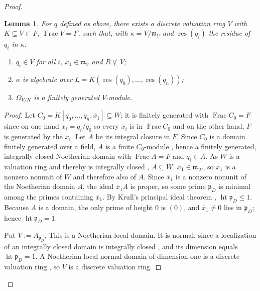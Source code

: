 \documentclass[pdflatex,sn-mathphys-num]{sn-jnl}
\numberwithin{equation}{section}
\theoremstyle{thmstyleone}
\newtheorem{lemma}[theorem]{Lemma}
\theoremstyle{thmstyletwo}
\begin{document}
\begin{proof}
\begin{lemma}\label{lem:place}
For $q$ defined as above, there exists a discrete valuation ring $V$ with $K\subseteq V\subset F$,
$\operatorname{Frac}V=F$, such that, with $\kappa=V/\mathfrak m_V$ and $\operatorname{res}(q_i)$ the
residue of $q_i$ in $\kappa$:
\begin{enumerate}[label=(\alph*)]
\item $q_i\in V$ for all $i$, $\bar x_1\in\mathfrak m_V$ and $R\not\subseteq V$;
\item $\kappa$ is algebraic over $L=K(\operatorname{res}(q_0),\dots, \operatorname{res}(q_n))$;
\item $\Omega_{V/K}$ is a finitely generated $V$-module.
\end{enumerate}
\end{lemma}
\begin{proof}
Let $C_0=K[q_0,\dots,q_n,\bar x_1]\subseteq W$; it is finitely generated with
$\operatorname{Frac}C_0=F$ since on one hand $\bar x_i = q_i/q_0$ so every $\bar x_i$ is in $\operatorname{Frac}C_0$ and on the other hand, $F$ is generated by the $\bar x_i$. Let $A$ be its integral closure in $F$. Since $C_0$ is a domain finitely generated over a field, $A$ is a finite $C_0$-module \cite[Thm. I.3.9A]{hartshorne}, hence a finitely generated, integrally
closed Noetherian domain with $\operatorname{Frac}A=F$ and $q_i\in A$. As $W$ is a valuation ring and thereby is
integrally closed \cite[Prop 5.18]{atiyah}, $A\subseteq W$. $\bar x_1 \in \mathfrak m_W$, so $x_1$ is a nonzero nonunit of $W$ and therefore also of $A$. Since $\bar x_1$ is a nonzero nonunit of the Noetherian domain $A$, the ideal
$\bar x_1A$ is proper, so some prime $\mathfrak p_D$ is minimal among the primes
containing $\bar x_1$. By Krull's principal ideal theorem
\cite[Corr. 11.17]{atiyah}, $\operatorname{ht}\mathfrak p_D\le1$. Because $A$
is a domain, the only prime of height $0$ is $(0)$, and $\bar x_1\neq0$ lies in
$\mathfrak p_D$; hence $\operatorname{ht}\mathfrak p_D=1$.

Put $V:=A_{\mathfrak p_D}$. This is a Noetherian local domain. It is normal,
since a localization of an integrally closed domain is integrally closed \cite[Prop 5.12]{atiyah}, and
its dimension equals $\operatorname{ht}\mathfrak p_D=1$. A Noetherian local
normal domain of dimension one is a discrete valuation ring
\cite[Thm. 11.2]{matsumura}, so $V$ is a discrete valuation ring.


\end{proof}
\end{proof}
\end{document}
